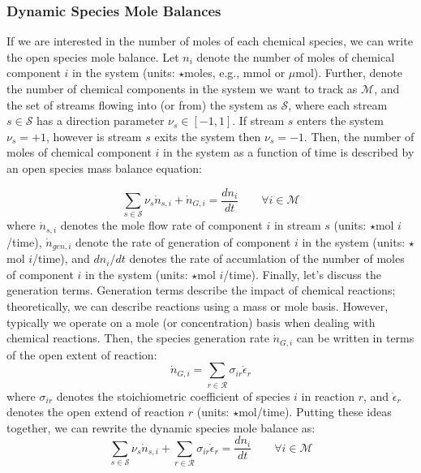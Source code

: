 \documentclass{article}[12pt]
\begin{document}
\subsubsection*{Dynamic Species Mole Balances}
If we are interested in the number of moles of each chemical species, we can write the open species mole balance.
Let $n_{i}$ denote the number of moles of chemical component $i$ in the system 
(units: $\star$moles, e.g., mmol or  $\mu$mol).
Further, denote the number of chemical components in the system we want to track as $\mathcal{M}$, and the set of
streams flowing into (or from) the system as $\mathcal{S}$, where each stream 
$s\in\mathcal{S}$ has a direction parameter $\nu_{s}\in\left[-1,1\right]$. 
If stream $s$ enters the system $\nu_{s} = +1$, however is stream $s$ exits the system then $\nu_{s} = -1$.
Then, the number of moles of chemical component $i$ in the system as a function of time is described by an 
open species mass balance equation:

\begin{equation}\label{eqn-species-mol-balance}
\sum_{s\in\mathcal{S}}\nu_{s}\dot{n}_{s,i} + \dot{n}_{G,i} = \frac{dn_{i}}{dt}
\qquad\forall{i}\in\mathcal{M}
\end{equation}
where $\dot{n}_{s,i}$ denotes the mole flow rate of component $i$ in stream $s$ (units: $\star$mol $i$/time),
$\dot{n}_{gen,i}$ denote the rate of generation of component $i$ in the system 
(units: $\star$mol $i$/time), and $dn_{i}/dt$ denotes the rate of accumlation of the number of moles of component $i$ in the system (units: $\star$mol $i$/time). 
Finally, let's discuss the generation terms. Generation terms describe the impact of chemical reactions; theoretically, we can describe reactions using a mass or mole basis. 
However, typically we operate on a mole (or concentration) basis when dealing with chemical reactions.
Then, the species generation rate $\dot{n}_{G,i}$ can be written in terms of the open extent of reaction:
\begin{equation}\label{eqn-open-extent-species}
\dot{n}_{G,i} = \sum_{r\in\mathcal{R}}\sigma_{ir}\dot{\epsilon}_{r}
\end{equation}
where $\sigma_{ir}$ denotes the stoichiometric coefficient of species $i$ in reaction $r$, and $\dot{\epsilon}_{r}$ denotes the open extend of reaction $r$ (units: $\star$mol/time).
Putting these ideas together, we can rewrite the dynamic species mole balance as:
\begin{equation}\label{eqn-dynamic-smb-with-extent}
\sum_{s\in\mathcal{S}}\nu_{s}\dot{n}_{s,i} + \sum_{r\in\mathcal{R}}\sigma_{ir}\dot{\epsilon}_{r} = \frac{dn_{i}}{dt}\qquad\forall{i\in\mathcal{M}}
\end{equation}
\end{document}
